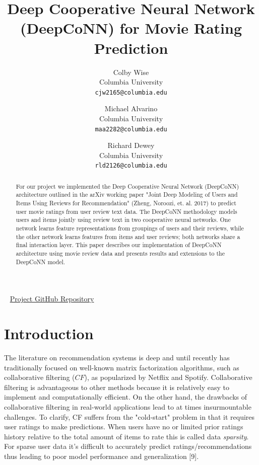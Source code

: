 \documentclass[10pt, twocolumn, letterpaper]{article}
\begin{document}
\title{Deep Cooperative Neural Network (DeepCoNN) for Movie Rating Prediction}

\author{Colby Wise\\
Columbia University\\
{\tt\small cjw2165@columbia.edu}
\and
Michael Alvarino\\
Columbia University\\
{\tt\small maa2282@columbia.edu}
\and
Richard Dewey\\
Columbia University\\
{\tt\small rld2126@columbia.edu}
}

\maketitle

\begin{abstract}
For our project we implemented the Deep Cooperative Neural Network (DeepCoNN) architecture outlined in the arXiv working paper "Joint Deep Modeling of Users and Items Using Reviews for Recommendation" (Zheng, Noroozi, et. al. 2017) to predict user movie ratings from user review text data. The DeepCoNN methodology models users and items jointly using review text in two cooperative neural networks. One network learns feature representations from groupings of users and their reviews, while the other network learns features from items and user reviews; both networks share a final interaction layer. This paper describes our implementation of DeepCoNN architecture using movie review data and presents results and extensions to the DeepCoNN model.
\end{abstract}
\ \newline
\href{https://github.com/michaelAlvarino/Deep-Learning}{Project GitHub Repository}

\section{Introduction}

\par The literature on recommendation systems is deep and until recently has traditionally focused on well-known matrix factorization algorithms, such as collaborative filtering ($CF$), as popularized by Netflix and Spotify. Collaborative filtering is advantageous to other methods because it is relatively easy to implement and computationally efficient. On the other hand, the drawbacks of collaborative filtering in real-world applications lead to at times insurmountable challenges. To clarify, CF suffers from the "cold-start" problem in that it requires user ratings to make predictions. When users have no or limited prior ratings history relative to the total amount of items to rate this is called data \textit{sparsity}. For sparse user data it's difficult to accurately predict ratings/recommendations thus leading to poor model performance and generalization [9].
\end{document}
